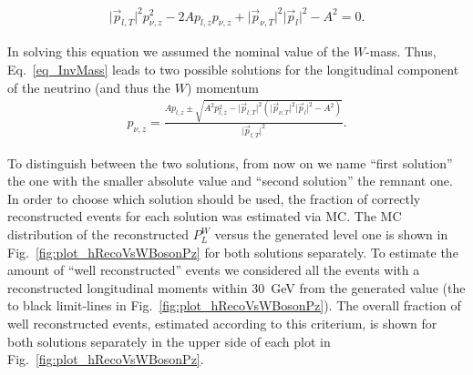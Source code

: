 \documentclass[12pt]{article}
\newcommand{\abs}[1]{\lvert#1\rvert}
\begin{document}
\begin{align}
\abs{\vec{p}_{l,T}}^2 p^2_{\nu,z} - 2A p_{l,z} p_{\nu,z} + \abs{\vec{p}_{\nu,T}}^2 \abs{\vec{p}_{l}}^2 - A^2 = 0.
\end{align}

In solving this equation we assumed the nominal value of the $W$-mass.  Thus, Eq.~\ref{eq_InvMass} leads to two possible solutions for the longitudinal component of the neutrino (and thus the $W$) momentum
\begin{align}
p_{\nu,z} = \frac{ A p_{l,z} \pm \sqrt{ A^2 p^2_{l,z} - \abs{\vec{p}_{l,T}}^2 (\abs{\vec{p}_{\nu,T}}^2 \abs{\vec{p}_{l}}^2 - A^2) } }{\abs{\vec{p}_{l,T}}^2}.
\end{align}

To distinguish between the two solutions, from now on we name ``first solution'' the one with the smaller absolute value and ``second solution'' the remnant one. In order to choose which solution should be used, the fraction of correctly reconstructed events for each solution was estimated via MC. The MC distribution of the reconstructed $P^{W}_{L}$ versus the generated level one is shown in Fig.~\ref{fig:plot_hRecoVsWBosonPz}  for both solutions separately. To estimate the amount of ``well reconstructed'' events we considered all the events with a reconstructed longitudinal moments within 30~GeV from the generated value (the to black limit-lines in  Fig.~\ref{fig:plot_hRecoVsWBosonPz}). The overall fraction of well reconstructed events, estimated according to this criterium, is shown for both solutions separately in the upper side of each plot in Fig.~\ref{fig:plot_hRecoVsWBosonPz}.
\end{document}
